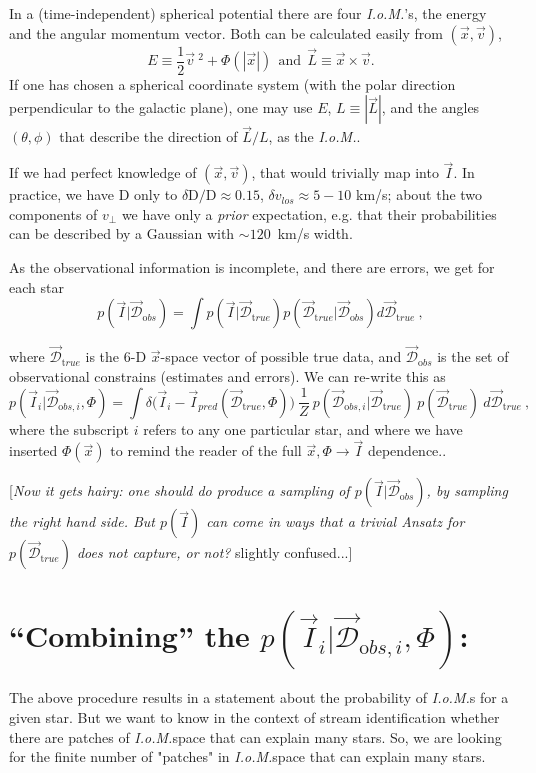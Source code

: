 \documentclass[12pt,a4paper,twoside]{article}
\newcommand{\D}{{\mathrm D}}
\newcommand{\dD}{\delta{\mathrm D}}
\newcommand{\vlos}{v_{los}}
\newcommand{\dvlos}{\delta\vlos}
\newcommand{\vperp}{v_\perp}
\newcommand{\vx}{\vec{x}}
\newcommand{\vv}{\vec{v}}
\newcommand{\xv}{(\vx,\vv)}
\newcommand{\vI}{\vec{I}}
\newcommand{\IoM}{{\sl I.o.M.}}
\newcommand{\vL}{\vec{L}}
\newcommand{\dtrue}{\vec{\mathcal D}_{\mathrm true}}
\newcommand{\dobs}{\vec{\mathcal D}_{\mathrm obs}}
\newcommand{\vIi}{\vec{I}_i}
\newcommand{\dobsi}{\vec{\mathcal D}_{{\mathrm obs},i}}
\begin{document}
In a (time-independent) spherical potential there are four \IoM 's, the energy and the angular momentum vector. Both can be calculated easily from $\xv$, 
$$E\equiv \frac{1}{2}\vv\ ^2+\Phi (|\vx |)\ \ {\mathrm{and}}\ \ \vL\equiv \vx \times \vv .$$
If one has chosen a spherical coordinate system (with the polar direction perpendicular to the galactic plane), one may use $E$, $L\equiv |\vL |$, and the angles $(\theta,\phi)$ that describe 
the direction of $\vL / L$, as the \IoM .

If we had perfect knowledge of $\xv$, that would trivially map into $\vI$. In practice, we have 
$\D$ only to $\dD / \D \approx 0.15$, $\dvlos \approx 5-10$ km/s; about the two components of $\vperp$ we have only a {\it prior} expectation, e.g. that their probabilities can be described by a Gaussian with $\sim 120$~km/s width.

As the observational information is incomplete, and there are errors, we get for each star
$$p(\vI | \dobs )={\displaystyle \int p(\vI | \dtrue) p(\dtrue | \dobs ) d \dtrue }\ ,$$

where $\dtrue$ is the 6-D $\vx$-space vector of possible true data, and $\dobs$ is the set 
of observational constrains (estimates and errors). We can re-write this as
$$p(\vIi | \dobsi,\Phi )={\displaystyle \int \delta \bigl( \vIi - \vI_{pred}(\dtrue,\Phi )\bigr ) 
\ \frac{1}{Z}\ p(\dobsi | \dtrue )\  p(\dtrue )\ d \dtrue }\ ,$$
where the subscript $i$ refers to any one particular star, and where we have inserted $\Phi (\vx)$
to remind the reader of the full $\vx ,\Phi \rightarrow \vI$ dependence..

[{\sl Now it gets hairy:  one should do produce a sampling of $p(\vI | \dobs )$, by sampling the
right hand side. But $p(\vI)$ can come in ways that a trivial {\it Ansatz} for $p(\dtrue)$ does not capture, or not?} slightly confused...]

\section{``Combining'' the $p(\vIi | \dobsi,\Phi )$:}

The above procedure results in a statement about the probability of \IoM s for a given star. But we want to know in the context of stream identification whether there are patches of \IoM space that can explain many stars. So, we are looking for the finite number of "patches" in \IoM space that 
can explain many stars.
\end{document}
